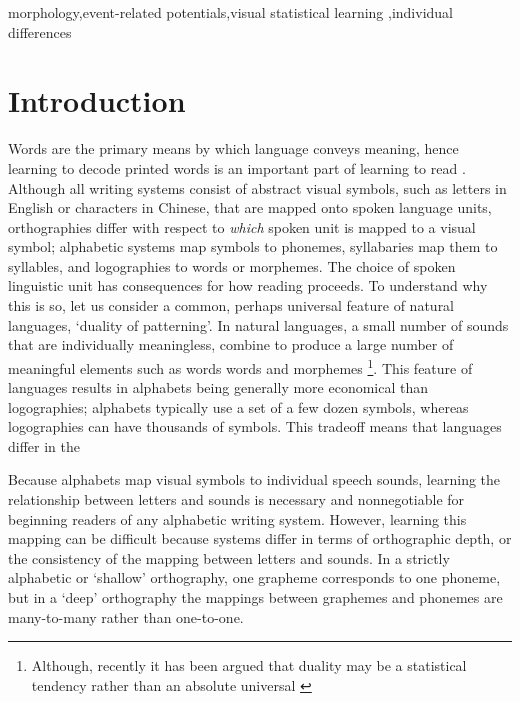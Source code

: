 \documentclass[review]{elsarticle}
\begin{document}
\begin{frontmatter}

\begin{keyword}
 morphology\sep event-related potentials\sep visual statistical learning \sep individual differences
\end{keyword}

\end{frontmatter}

\linenumbers

\section{Introduction}

Words are the primary means by which language conveys meaning, hence learning to decode printed words is an important part of learning to read \citep[e.g.,][]{castlesEndingReadingWars2018}.  Although all writing systems consist of abstract visual symbols, such as letters in English or characters in Chinese, that are mapped onto spoken language units, orthographies differ with respect to \textit{which} spoken unit is mapped to a visual symbol; alphabetic systems map symbols to phonemes, syllabaries  map them to syllables, and logographies to words or morphemes.  The choice of spoken linguistic unit has consequences for how reading proceeds. To understand why this is so, let us consider a common, perhaps universal feature of natural languages, `duality of patterning'. In natural languages, a small number of sounds that are individually meaningless, combine to produce a large number of meaningful elements  such as words words and morphemes\citep{hockettOriginSpeech1960} \footnote{Although, recently it has been argued that duality may be a statistical tendency rather than an absolute universal \citep{blevinsDualityPatterningAbsolute2012}}.  This feature of languages results in alphabets being  generally more economical than logographies; alphabets typically use a set of a few dozen symbols,  whereas logographies can have thousands of symbols.  This tradeoff means that languages differ in the 

Because alphabets map visual symbols to individual speech sounds,  learning the relationship between letters and sounds is necessary and nonnegotiable for beginning readers of any alphabetic writing system.  However, learning this mapping can be difficult because systems differ in terms of orthographic depth, or the consistency of the mapping between letters and sounds. In a strictly alphabetic or ‘shallow’ orthography, one grapheme corresponds to one phoneme, but in a ‘deep’ orthography the mappings between graphemes and phonemes  are many-to-many rather than one-to-one. 
\end{document}
